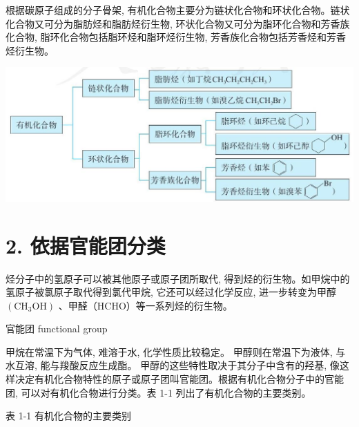 \documentclass[10pt]{article}
\begin{document}
根据碳原子组成的分子骨架, 有机化合物主要分为链状化合物和环状化合物。链状化合物又可分为脂肪烃和脂肪烃衍生物, 环状化合物又可分为脂环化合物和芳香族化合物, 脂环化合物包括脂环烃和脂环烃衍生物, 芳香族化合物包括芳香烃和芳香烃衍生物。

\begin{center}
\includegraphics[max width=1.0\textwidth]{images/0190efc5-b58a-7c43-bfb0-e0a030df9cfd_9_278871.jpg}
\end{center}

\section*{2. 依据官能团分类}

烃分子中的氢原子可以被其他原子或原子团所取代, 得到烃的衍生物。如甲烷中的氢原子被氯原子取代得到氯代甲烷, 它还可以经过化学反应, 进一步转变为甲醇 \(\left( {{\mathrm{{CH}}}_{3}\mathrm{{OH}}}\right)\) 、甲醛（HCHO）等一系列烃的衍生物。

\begin{mdframed}

官能团 functional group

\end{mdframed}

甲烷在常温下为气体, 难溶于水, 化学性质比较稳定。 甲醇则在常温下为液体, 与水互溶, 能与羧酸反应生成酯。 甲醇的这些特性取决于其分子中含有的羟基, 像这样决定有机化合物特性的原子或原子团叫官能团。根据有机化合物分子中的官能团, 可以对有机化合物进行分类。表 1-1 列出了有机化合物的主要类别。

表 1-1 有机化合物的主要类别
\end{document}

